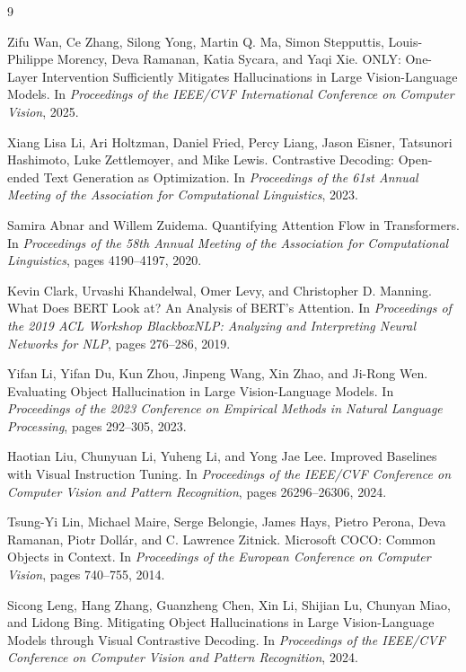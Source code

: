 {
\begin{thebibliography}{9}

Zifu Wan, Ce Zhang, Silong Yong, Martin Q. Ma, Simon Stepputtis, Louis-Philippe Morency, Deva Ramanan, Katia Sycara, and Yaqi Xie.
\newblock ONLY: One-Layer Intervention Sufficiently Mitigates Hallucinations in Large Vision-Language Models.
\newblock In \textit{Proceedings of the IEEE/CVF International Conference on Computer Vision}, 2025.

Xiang Lisa Li, Ari Holtzman, Daniel Fried, Percy Liang, Jason Eisner, Tatsunori Hashimoto, Luke Zettlemoyer, and Mike Lewis.
\newblock Contrastive Decoding: Open-ended Text Generation as Optimization.
\newblock In \textit{Proceedings of the 61st Annual Meeting of the Association for Computational Linguistics}, 2023.

Samira Abnar and Willem Zuidema.
\newblock Quantifying Attention Flow in Transformers.
\newblock In \textit{Proceedings of the 58th Annual Meeting of the Association for Computational Linguistics}, pages 4190--4197, 2020.

Kevin Clark, Urvashi Khandelwal, Omer Levy, and Christopher D. Manning.
\newblock What Does BERT Look at? An Analysis of BERT's Attention.
\newblock In \textit{Proceedings of the 2019 ACL Workshop BlackboxNLP: Analyzing and Interpreting Neural Networks for NLP}, pages 276--286, 2019.

Yifan Li, Yifan Du, Kun Zhou, Jinpeng Wang, Xin Zhao, and Ji-Rong Wen.
\newblock Evaluating Object Hallucination in Large Vision-Language Models.
\newblock In \textit{Proceedings of the 2023 Conference on Empirical Methods in Natural Language Processing}, pages 292--305, 2023.

Haotian Liu, Chunyuan Li, Yuheng Li, and Yong Jae Lee.
\newblock Improved Baselines with Visual Instruction Tuning.
\newblock In \textit{Proceedings of the IEEE/CVF Conference on Computer Vision and Pattern Recognition}, pages 26296--26306, 2024.


Tsung-Yi Lin, Michael Maire, Serge Belongie, James Hays, Pietro Perona, Deva Ramanan, Piotr Doll\'ar, and C. Lawrence Zitnick.
\newblock Microsoft COCO: Common Objects in Context.
\newblock In \textit{Proceedings of the European Conference on Computer Vision}, pages 740--755, 2014.

Sicong Leng, Hang Zhang, Guanzheng Chen, Xin Li, Shijian Lu, Chunyan Miao, and Lidong Bing.
\newblock Mitigating Object Hallucinations in Large Vision-Language Models through Visual Contrastive Decoding.
\newblock In \textit{Proceedings of the IEEE/CVF Conference on Computer Vision and Pattern Recognition}, 2024.


\end{thebibliography}}
